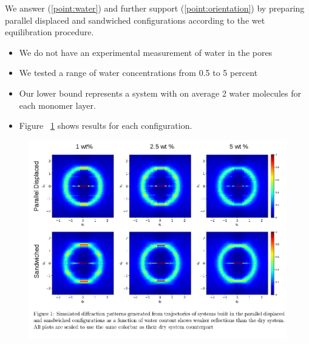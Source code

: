 \documentclass{article}
\begin{document}
  We answer (\ref{point:water}) and further support (\ref{point:orientation}) by preparing parallel displaced and
  sandwiched configurations according to the wet equilibration procedure.
  \begin{itemize}
	\item We do not have an experimental measurement of water in the pores
	\item We tested a range of water concentrations from 0.5 to 5 percent %
	\item Our lower bound represents a system with on average 2 water 
	molecules for each monomer layer.
	\item Figure ~\ref{fig:solvation} shows results for each configuration.
  \end{itemize}

  \begin{figure}
	\centering
	\includegraphics[width=\textwidth]{solvation.png}  %
	\label{fig:solvation}
  \end{figure}
\end{document}
